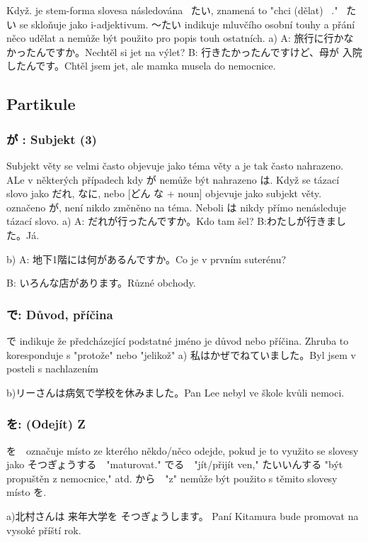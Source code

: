 Když. je stem-forma slovesa následována  ~たい, znamená to "chci (dělat) ~." ~たい se skloňuje jako i-adjektivum.
〜たい indikuje mluvčího osobní touhy a přání něco udělat a nemůže být použito pro popis touh ostatních.
a) 
A: 旅行に行かなかったんですか。Nechtěl si jet na výlet?
B: 行きたかったんですけど、母が 入院したんです。Chtěl jsem jet, ale mamka musela do nemocnice.

\subsection{Partikule}
\subsubsection{が : Subjekt (3)}

Subjekt  věty se velmi často  objevuje jako téma věty a je tak často nahrazeno. ALe v některých případech kdy  が nemůže být nahrazeno  は. Když se tázací slovo jako だれ, なに, nebo [どん な + noun] objevuje jako subjekt věty. označeno が, není nikdo změněno na téma. Neboli は nikdy přímo nenásleduje tázací slovo.
a)
A: だれが行ったんですか。Kdo tam šel?
B:わたしが行きました。Já.

b) A: 地下1階には何があるんですか。Co je v prvním suterénu?

B: いろんな店があります。Různé obchody.

\subsubsection{ で: Důvod, příčina}
で indikuje že předcházející podstatné jméno je důvod nebo příčina. Zhruba to koresponduje s "protože" nebo "jelikož"
a) 私はかぜでねていました。Byl jsem v posteli s nachlazením

b)リーさんは病気で学校を休みました。Pan Lee nebyl ve škole kvůli nemoci.

\subsubsection{ を: (Odejít) Z}


を　označuje místo ze kterého někdo/něco odejde, pokud je to využito se slovesy jako そつぎょうする　"maturovat." でる　"jít/přijít ven," たいいんする "být propuštěn z nemocnice," atd.  から　"z" nemůže být použito s těmito slovesy místo を.

a)北村さんは 来年大学を そつぎょうします。 Paní Kitamura bude promovat na vysoké příští rok.

